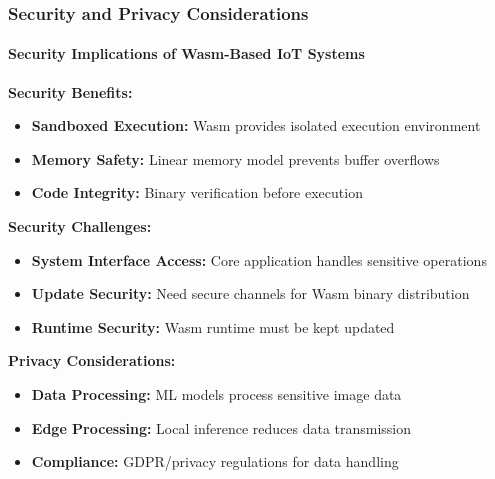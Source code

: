 \documentclass{beamer}
\begin{document}
\begin{frame}
\frametitle{Security and Privacy Considerations}
\framesubtitle{Security Implications of Wasm-Based IoT Systems}

\textbf{Security Benefits:}
\begin{itemize}
\item \textbf{Sandboxed Execution:} Wasm provides isolated execution environment
\item \textbf{Memory Safety:} Linear memory model prevents buffer overflows
\item \textbf{Code Integrity:} Binary verification before execution
\end{itemize}

\textbf{Security Challenges:}
\begin{itemize}
\item \textbf{System Interface Access:} Core application handles sensitive operations
\item \textbf{Update Security:} Need secure channels for Wasm binary distribution
\item \textbf{Runtime Security:} Wasm runtime must be kept updated
\end{itemize}

\textbf{Privacy Considerations:}
\begin{itemize}
\item \textbf{Data Processing:} ML models process sensitive image data
\item \textbf{Edge Processing:} Local inference reduces data transmission
\item \textbf{Compliance:} GDPR/privacy regulations for data handling
\end{itemize}
\end{frame}
\end{document}
